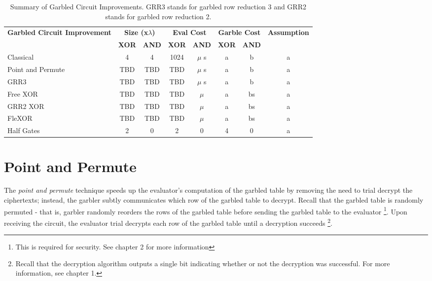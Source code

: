 \begin{table}[t]
    \label{tbl:gc-costs}
    \centering
    \renewcommand{\arraystretch}{1.2}
    \begin{adjustbox}{width=1\textwidth}
        \begin{tabular}{|p{5cm}|c|c|c|c|c|c|c|}
            \hline
            \multirow{2}{5cm}{\centering \textbf{Garbled Circuit Improvement}} & 
            \multicolumn{2}{c|}{\textbf{Size (x$\lambda$)}} & 
            \multicolumn{2}{c|}{\textbf{Eval Cost}} & 
            \multicolumn{2}{c|}{\textbf{Garble Cost}} &
            \multirow{2}{3cm}{\centering \textbf{Assumption}} \\
            \cline{2-7}
            & \textbf{XOR} & \textbf{AND} & \textbf{XOR} & \textbf{AND}  & \textbf{XOR} & \textbf{AND} & \\
            \hline
            Classical & 4 & 4 & 1024 & $\mu$ s & a & b & a\\ \hline
            Point and Permute & TBD & TBD & TBD & $\mu$ s & a & b & a\\ \hline
            GRR3 & TBD & TBD & TBD & $\mu$ s  & a & b& a\\ \hline
            Free XOR & TBD & TBD & TBD & $\mu$ & a & bs& a  \\ \hline
            GRR2 XOR & TBD & TBD & TBD & $\mu$ & a & bs  & a\\ \hline
            FleXOR& TBD & TBD & TBD & $\mu$ & a & bs & a \\ \hline
            Half Gates & 2 & 0 & 2 & 0 & 4 & 0 & a \\ \hline
        \end{tabular}
    \end{adjustbox}
    \caption{Summary of Garbled Circuit Improvements. GRR3 stands for garbled row reduction 3 and GRR2 stands for garbled row reduction 2. }
\end{table}

\section{Point and Permute}

The \textit{point and permute} technique speeds up the evaluator's computation of the garbled table by removing the need to trial decrypt the ciphertexts; instead, the garbler subtly communicates which row of the garbled table to decrypt.
Recall that the garbled table is randomly permuted - that is, garbler randomly reorders the rows of the garbled table before sending the garbled table to the evaluator \footnote{This is required for security. See chapter 2 for more information}.
Upon receiving the circuit, the evaluator trial decrypts each row of the garbled table until a decryption succeeds \footnote{Recall that the decryption algorithm outputs a single bit indicating whether or not the decryption was successful. For more information, see chapter 1.}.

